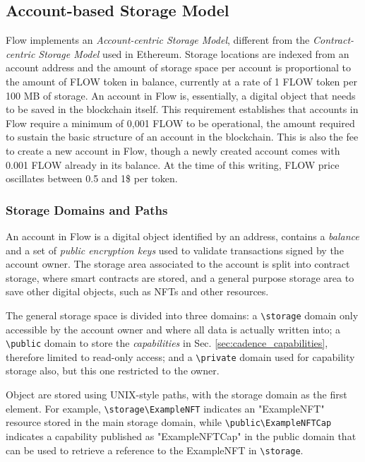 \documentclass[../NFTComp_IEEE.tex]{subfiles}
\begin{document}
\subsection{Account-based Storage Model}
Flow implements an \textit{Account-centric Storage Model}, different from the \textit{Contract-centric Storage Model} used in Ethereum. Storage locations are indexed from an account address and the amount of storage space per account is proportional to the amount of FLOW token in balance, currently at a rate of 1 FLOW token per 100 MB of storage. An account in Flow is, essentially, a digital object that needs to be saved in the blockchain itself. This requirement establishes that accounts in Flow require a minimum of 0,001 FLOW to be operational, the amount required to sustain the basic structure of an account in the blockchain. This is also the fee to create a new account in Flow, though a newly created account comes with 0.001 FLOW already in its balance. At the time of this writing, FLOW price oscillates between 0.5 and 1\$ per token.

\subsubsection{Storage Domains and Paths}
\label{sec:cadence_storage_domain}
An account in Flow is a digital object identified by an address, contains a \textit{balance} and a set of \textit{public encryption keys} used to validate transactions signed by the account owner. The storage area associated to the account is split into contract storage, where smart contracts are stored, and a general purpose storage area to save other digital objects, such as NFTs and other resources.
\par
The general storage space is divided into three domains: a \verb |\storage| domain only accessible by the account owner and where all data is actually written into; a \verb |\public| domain to store the \textit{capabilities} in Sec. \ref{sec:cadence_capabilities}, therefore limited to read-only access; and a \verb |\private| domain used for capability storage also, but this one restricted to the owner.
\par
Object are stored using UNIX-style paths, with the storage domain as the first element. For example, \verb |\storage\ExampleNFT| indicates an "ExampleNFT" resource stored in the main storage domain, while \verb |\public\ExampleNFTCap| indicates a capability published as "ExampleNFTCap" in the public domain that can be used to retrieve a reference to the ExampleNFT in \verb|\storage|.
\end{document}
